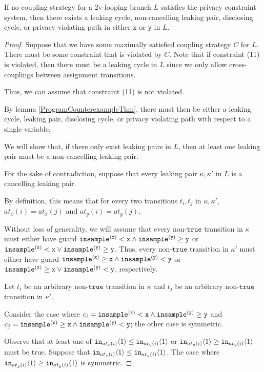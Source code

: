 \begin{lemma}
    If no coupling strategy for a 2v-looping branch $L$ satisfies the privacy constraint system, then there exists a leaking cycle, non-cancelling leaking pair, disclosing cycle, or privacy violating path in either $\texttt{x}$ or $\texttt{y}$ in $L$.
\end{lemma}
\begin{proof}
    Suppose that we have some maximally satisfied coupling strategy $C$ for $L$. There must be some constraint that is violated by $C$. Note that if constraint (11) is violated, then there must be a leaking cycle in $L$ since we only allow cross-couplings between assignment transitions. 

    Thus, we can assume that constraint (11) is not violated. 

    By lemma \ref{ProgramCounterexampleThm}, there must then be either a leaking cycle, leaking pair, disclosing cycle, or privacy violating path with respect to a single variable. 

    We will show that, if there only exist leaking pairs in $L$, then at least one leaking pair must be a non-cancelling leaking pair. 

    For the sake of contradiction, suppose that every leaking pair $\kappa, \kappa'$ in $L$ is a cancelling leaking pair. 

    By definition, this means that for every two transitions $t_i, t_j$ in $\kappa, \kappa'$, $at_x(i) = at_x(j)$ and $at_y(i) = at_y(j)$.

    Without loss of generality, we will assume that every non-$\texttt{true}$ transition in $\kappa$ must either have guard $\mvlguard[\texttt{x}]\land\mvgguard[\texttt{y}]$ or $\mvlguard[\texttt{x}]\lor\mvgguard[\texttt{y}]$. Thus, every non-$\texttt{true}$ transition in $\kappa'$ must either have guard $\mvgguard[\texttt{x}]\land\mvlguard[\texttt{y}]$ or $\mvgguard[\texttt{x}]\lor\mvlguard[\texttt{y}]$, respectively. 

    Let $t_i$ be an arbitrary non-$\texttt{true}$ transition in $\kappa$ and $t_j$ be an arbitrary non-$\texttt{true}$ transition in $\kappa'$.

    Consider the case where $c_i = \mvlguard[\texttt{x}]\land\mvgguard[\texttt{y}]$ and $c_j = \mvgguard[\texttt{x}]\land\mvlguard[\texttt{y}]$; the other case is symmetric.

    Observe that at least one of $\texttt{in}_{at_x(i)}\brangle{1}\leq \texttt{in}_{at_y(i)}\brangle{1}$ or $\texttt{in}_{at_y(i)}\brangle{1}\geq \texttt{in}_{at_y(i)}\brangle{1}$ must be true. Suppose that $\texttt{in}_{at_x(i)}\brangle{1}\leq \texttt{in}_{at_y(i)}\brangle{1}$. The case where $\texttt{in}_{at_y(i)}\brangle{1}\geq \texttt{in}_{at_y(i)}\brangle{1}$ is symmetric. 


\end{proof}
